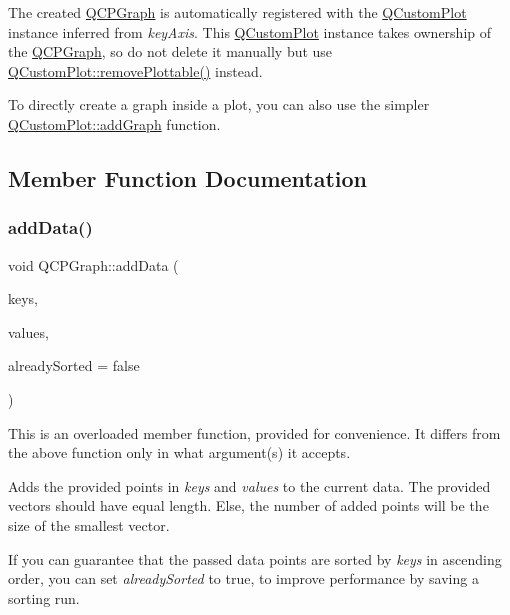 The created \hyperlink{classQCPGraph}{Q\+C\+P\+Graph} is automatically registered with the \hyperlink{classQCustomPlot}{Q\+Custom\+Plot} instance inferred from {\itshape key\+Axis}. This \hyperlink{classQCustomPlot}{Q\+Custom\+Plot} instance takes ownership of the \hyperlink{classQCPGraph}{Q\+C\+P\+Graph}, so do not delete it manually but use \hyperlink{classQCustomPlot_af3dafd56884208474f311d6226513ab2}{Q\+Custom\+Plot\+::remove\+Plottable()} instead.

To directly create a graph inside a plot, you can also use the simpler \hyperlink{classQCustomPlot_a6fb2873d35a8a8089842d81a70a54167}{Q\+Custom\+Plot\+::add\+Graph} function. 

\subsection{Member Function Documentation}
\mbox{\label{classQCPGraph_ae0555c0d3fe0fa7cb8628f88158d420f}} 
\subsubsection{\texorpdfstring{add\+Data()}{addData()}\hspace{0.1cm}{\footnotesize\ttfamily [1/2]}}
{\footnotesize\ttfamily void Q\+C\+P\+Graph\+::add\+Data (\begin{DoxyParamCaption}\item[{const Q\+Vector$<$ double $>$ \&}]{keys,  }\item[{const Q\+Vector$<$ double $>$ \&}]{values,  }\item[{bool}]{already\+Sorted = {\ttfamily false} }\end{DoxyParamCaption})}

This is an overloaded member function, provided for convenience. It differs from the above function only in what argument(s) it accepts.

Adds the provided points in {\itshape keys} and {\itshape values} to the current data. The provided vectors should have equal length. Else, the number of added points will be the size of the smallest vector.

If you can guarantee that the passed data points are sorted by {\itshape keys} in ascending order, you can set {\itshape already\+Sorted} to true, to improve performance by saving a sorting run.

